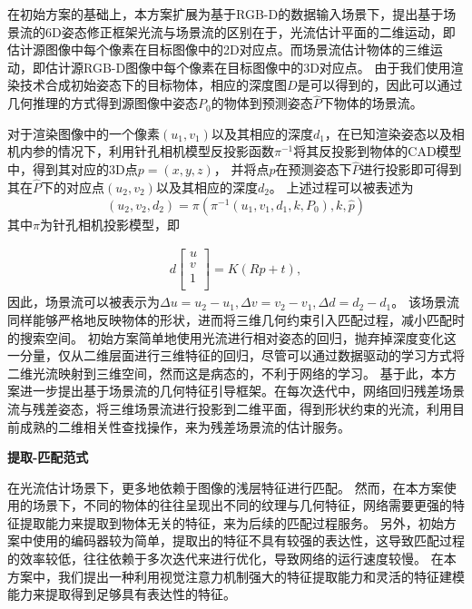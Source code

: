 \documentclass[12pt]{article}
\begin{document}
在初始方案的基础上，本方案扩展为基于RGB-D的数据输入场景下，提出基于场景流的6D姿态修正框架光流与场景流的区别在于，光流估计平面的二维运动，即估计源图像中每个像素在目标图像中的2D对应点。而场景流估计物体的三维运动，即估计源RGB-D图像中每个像素在目标图像中的3D对应点。
由于我们使用渲染技术合成初始姿态下的目标物体，相应的深度图$D$是可以得到的，因此可以通过几何推理的方式得到源图像中姿态$P_0$的物体到预测姿态$\hat{P}$下物体的场景流。

对于渲染图像中的一个像素$(u_1,v_1)$以及其相应的深度$d_1$，在已知渲染姿态以及相机内参的情况下，利用针孔相机模型反投影函数$\pi^{-1}$将其反投影到物体的CAD模型中，得到其对应的3D点$p=(x,y,z)$，
并将点$p$在预测姿态下$\hat{P}$进行投影即可得到其在$\hat{P}$下的对应点$(u_2,v_2)$以及其相应的深度$d_2$。
上述过程可以被表述为
\begin{equation}
    (u_2,v_2,d_2) = \pi(\pi^{-1}(u_1, v_1,d_1, k,P_0), k, \hat{p})
\end{equation}
其中$\pi$为针孔相机投影模型，即

\begin{equation}
    \begin{aligned}
    d
    \begin{bmatrix}
    u \\
    v \\
    1 \\
    \end{bmatrix}
    =K(Rp+t),
    \end{aligned}
\end{equation}
因此，场景流可以被表示为$\Delta u = u_2 - u_1, \Delta v = v_2 - v_1, \Delta d = d_2 - d_1$。
该场景流同样能够严格地反映物体的形状，进而将三维几何约束引入匹配过程，减小匹配时的搜索空间。
初始方案简单地使用光流进行相对姿态的回归，抛弃掉深度变化这一分量，仅从二维层面进行三维特征的回归，尽管可以通过数据驱动的学习方式将二维光流映射到三维空间，然而这是病态的，不利于网络的学习。
基于此，本方案进一步提出基于场景流的几何特征引导框架。在每次迭代中，网络回归残差场景流与残差姿态，将三维场景流进行投影到二维平面，得到形状约束的光流，利用目前成熟的二维相关性查找操作，来为残差场景流的估计服务。






\textbf{提取-匹配范式}

在光流估计场景下，更多地依赖于图像的浅层特征进行匹配。
然而，在本方案使用的场景下，不同的物体的往往呈现出不同的纹理与几何特征，网络需要更强的特征提取能力来提取到物体无关的特征，来为后续的匹配过程服务。
另外，初始方案中使用的编码器较为简单，提取出的特征不具有较强的表达性，这导致匹配过程的效率较低，往往依赖于多次迭代来进行优化，导致网络的运行速度较慢。
在本方案中，我们提出一种利用视觉注意力机制强大的特征提取能力和灵活的特征建模能力来提取得到足够具有表达性的特征。
\end{document}
